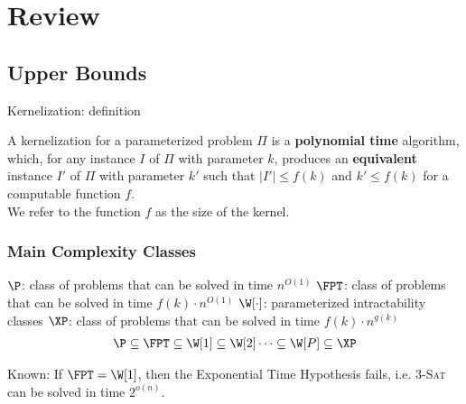 

	


\section{Review}

\subsection{Upper Bounds}

\begin{frame}{Kernelization: definition}

\begin{definition}
	A \alert{kernelization} for a parameterized problem $\Pi$ is a
	\textbf{polynomial time} algorithm, which, for any instance $I$ of $\Pi$ with parameter $k$,
	produces an \textbf{equivalent} instance $I'$ of $\Pi$ with parameter $k'$ such that
	$|I'| \le f(k)$ and $k'\le f(k)$ for a computable function $f$.\\
	We refer to the function $f$ as the \alert{size} of the kernel.
\end{definition}

\end{frame}

\begin{frame}
\frametitle{Main Complexity Classes}

\noindent
$\P$: class of problems that can be solved in time $n^{O(1)}$\newline
$\FPT$: class of problems that can be solved in time $f(k) \cdot n^{O(1)}$\newline
$\W[\cdot]$: parameterized intractability classes\newline
$\XP$: class of problems that can be solved in time $f(k) \cdot n^{g(k)}$ %
%
\slides{\bigskip}
\begin{align*}
\P \subseteq \FPT \subseteq \W[1] \subseteq \W[2] \dots \subseteq \W[P] \subseteq \XP
\end{align*}
\slides{\bigskip}

\noindent
Known: If $\FPT = \W[1]$, then the Exponential Time Hypothesis fails,
i.e. 3-\textsc{Sat} can be solved in time $2^{o(n)}$.

\end{frame}


